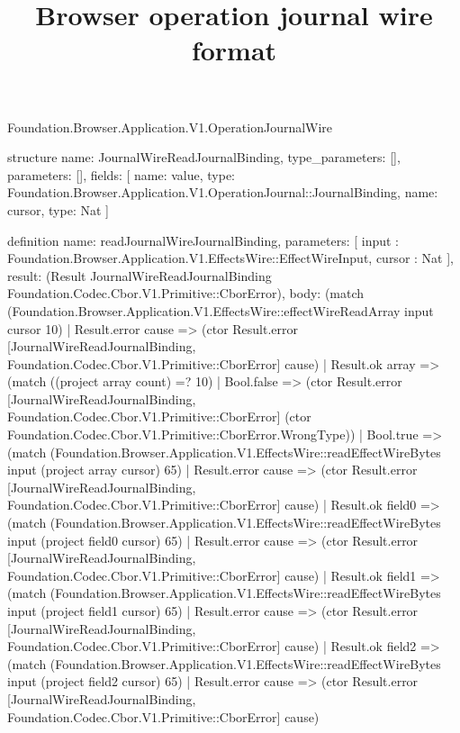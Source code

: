 \begin{lexlean}{Foundation.Browser.Application.V1.OperationJournalWire}
\title{Browser operation journal wire format}
\begin{semanticmodule}
structure{
  name: JournalWireReadJournalBinding,
  type_parameters: [],
  parameters: [],
  fields: [
    {name: value, type: Foundation.Browser.Application.V1.OperationJournal::JournalBinding},
    {name: cursor, type: Nat}
  ]
}

definition{
  name: readJournalWireJournalBinding,
  parameters: [
    input : Foundation.Browser.Application.V1.EffectsWire::EffectWireInput,
    cursor : Nat
  ],
  result: (Result JournalWireReadJournalBinding Foundation.Codec.Cbor.V1.Primitive::CborError),
  body: (match (Foundation.Browser.Application.V1.EffectsWire::effectWireReadArray input cursor 10)
    | Result.error cause => (ctor Result.error [JournalWireReadJournalBinding, Foundation.Codec.Cbor.V1.Primitive::CborError] cause)
    | Result.ok array => (match ((project array count) =? 10)
      | Bool.false => (ctor Result.error [JournalWireReadJournalBinding, Foundation.Codec.Cbor.V1.Primitive::CborError] (ctor Foundation.Codec.Cbor.V1.Primitive::CborError.WrongType))
      | Bool.true => (match (Foundation.Browser.Application.V1.EffectsWire::readEffectWireBytes input (project array cursor) 65)
        | Result.error cause => (ctor Result.error [JournalWireReadJournalBinding, Foundation.Codec.Cbor.V1.Primitive::CborError] cause)
        | Result.ok field0 => (match (Foundation.Browser.Application.V1.EffectsWire::readEffectWireBytes input (project field0 cursor) 65)
          | Result.error cause => (ctor Result.error [JournalWireReadJournalBinding, Foundation.Codec.Cbor.V1.Primitive::CborError] cause)
          | Result.ok field1 => (match (Foundation.Browser.Application.V1.EffectsWire::readEffectWireBytes input (project field1 cursor) 65)
            | Result.error cause => (ctor Result.error [JournalWireReadJournalBinding, Foundation.Codec.Cbor.V1.Primitive::CborError] cause)
            | Result.ok field2 => (match (Foundation.Browser.Application.V1.EffectsWire::readEffectWireBytes input (project field2 cursor) 65)
              | Result.error cause => (ctor Result.error [JournalWireReadJournalBinding, Foundation.Codec.Cbor.V1.Primitive::CborError] cause)
}
\end{semanticmodule}
\end{lexlean}
